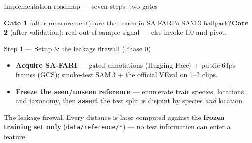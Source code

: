 \documentclass[aspectratio=169,11pt]{beamer}
\newcommand{\frozen}[1]{{\color{navy}\textbf{#1}}}
\begin{document}
\begin{frame}{Implementation roadmap --- seven steps, two gates}
  \centering
  \vspace{0.7em}

  \footnotesize \textcolor{burnt}{\textbf{Gate 1}} (after measurement): are the scores in SA-FARI's SAM\,3
  ballpark?\quad \textcolor{burnt}{\textbf{Gate 2}} (after validation): real out-of-sample signal ---
  else invoke H0 and pivot.
\end{frame}

\begin{frame}{Step 1 --- Setup \& the leakage firewall \small(Phase 0)}
  \begin{itemize}
    \item \textbf{Acquire SA-FARI} --- gated annotations (Hugging Face) + public 6\,fps frames (GCS);
          smoke-test SAM\,3 + the official VEval on 1--2 clips.
    \item \textbf{Freeze the seen/unseen reference} --- enumerate train species, locations, and taxonomy,
          then \textbf{assert} the test split is disjoint by species \emph{and} location.
  \end{itemize}
  \vspace{0.3em}
  \begin{block}{The leakage firewall}
    \centering Every distance is later computed against the \frozen{frozen training set only}
    (\texttt{data/reference/*}) --- no test information can enter a feature.
  \end{block}
\end{frame}
\end{document}
